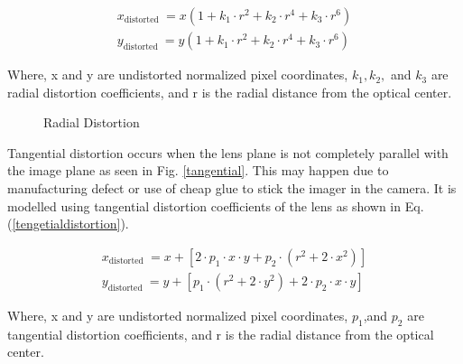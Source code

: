 \begin{equation}
\begin{array}{l}
x_{\text {distorted }}=x\left(1+k_{1} \cdot r^{2}+k_{2} \cdot r^{4}+k_{3} \cdot r^{6}\right) \\
y_{\text {distorted }}=y\left(1+k_{1} \cdot r^{2}+k_{2}{ } \cdot r^{4}+k_{3}{ } \cdot r^{6}\right)
\end{array}
\label{radialdistortion}
\end{equation}

Where, x and y are undistorted normalized pixel coordinates, $k_{1}, k_{2},$ and $k_{3}$ are radial distortion coefficients, and r is the radial distance from the optical center.  

\begin{figure}
    \centering
    \caption{Radial Distortion \cite{opencv}}
    \label{radial}
\end{figure}

Tangential distortion occurs when the lens plane is not completely parallel with the image plane as seen in Fig. \ref{tangential}. This may happen due to manufacturing defect or use of cheap glue to stick the imager in the camera. It is modelled using tangential distortion coefficients of the lens as shown in Eq. (\ref{tengetialdistortion}).

\begin{equation}
\begin{array}{l}
x_{\text {distorted }}=x+\left[2 \cdot p_{1} \cdot x \cdot y+p_{2} \cdot \left(r^{2}+2 \cdot x^{2}\right)\right] \\
y_{\text {distorted }}=y+\left[p_{1} \cdot\left(r^{2}+2 \cdot y^{2}\right)+2 \cdot p_{2} \cdot x \cdot y\right]
\end{array}
\label{tengetialdistortion}
\end{equation}

Where, x and y are undistorted normalized pixel coordinates, $p_{1}$,and $p_{2}$ are tangential distortion coefficients, and r is the radial distance from the optical center. 

